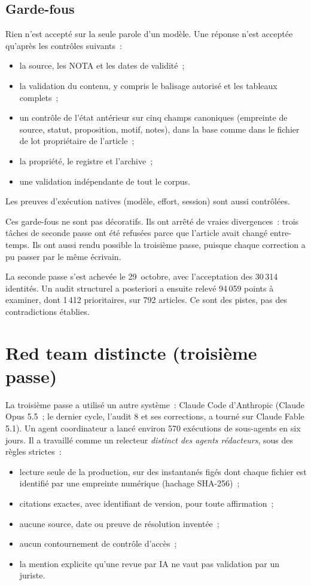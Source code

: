 \documentclass[11pt,a4paper]{article}
\begin{document}
\subsection{Garde-fous}

Rien n'est accepté sur la seule parole d'un modèle. Une réponse n'est acceptée qu'après les contrôles suivants~:
\begin{itemize}
  \item la source, les NOTA et les dates de validité~;
  \item la validation du contenu, y compris le balisage autorisé et les tableaux complets~;
  \item un contrôle de l'état antérieur sur cinq champs canoniques (empreinte de source, statut, proposition, motif, notes), dans la base comme dans le fichier de lot propriétaire de l'article~;
  \item la propriété, le registre et l'archive~;
  \item une validation indépendante de tout le corpus.
\end{itemize}
Les preuves d'exécution natives (modèle, effort, session) sont aussi contrôlées.

Ces garde-fous ne sont pas décoratifs. Ils ont arrêté de vraies divergences~: trois tâches de seconde passe ont été refusées parce que l'article avait changé entre-temps. Ils ont aussi rendu possible la troisième passe, puisque chaque correction a pu passer par le même écrivain.

La seconde passe s'est achevée le 29~octobre, avec l'acceptation des 30\,314 identités. Un audit structurel a posteriori a ensuite relevé 94\,059 points à examiner, dont 1\,412 prioritaires, sur 792 articles. Ce sont des pistes, pas des contradictions établies.

\section{Red team distincte (troisième passe)}
\label{fr:sec:redteam}

La troisième passe a utilisé un autre système~: Claude Code d'Anthropic (Claude Opus 5.5~; le dernier cycle, l'audit 8 et ses corrections, a tourné sur Claude Fable 5.1). Un agent coordinateur a lancé environ 570 exécutions de sous-agents en six jours. Il a travaillé comme un relecteur \emph{distinct des agents rédacteurs}, sous des règles strictes~:
\begin{itemize}
  \item lecture seule de la production, sur des instantanés figés dont chaque fichier est identifié par une empreinte numérique (hachage SHA-256)~;
  \item citations exactes, avec identifiant de version, pour toute affirmation~;
  \item aucune source, date ou \og preuve de résolution \fg{} inventée~;
  \item aucun contournement de contrôle d'accès~;
  \item la mention explicite qu'une revue par IA ne vaut pas validation par un juriste.
\end{itemize}
\end{document}
